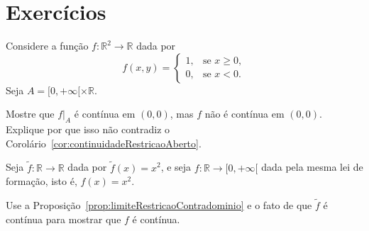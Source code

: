 \section*{Exercícios}

\begin{exercise}
    Considere a função $f:\mathbb R^2\to \mathbb R$ dada por
    \[
        f(x, y)=
        \begin{cases}
            1, & \text{se } x\geq 0,\\
            0, & \text{se } x<0.
        \end{cases}
    \]
    Seja $A=[0,+\infty[\times\mathbb R$.

    Mostre que $f|_A$ é contínua em $(0,0)$, mas $f$ não é contínua em $(0,0)$.
    Explique por que isso não contradiz o Corolário~\ref{cor:continuidadeRestricaoAberto}.
\end{exercise}

\begin{exercise}
    Seja $\widetilde f:\mathbb R\to\mathbb R$ dada por $\widetilde f(x)=x^2$,
    e seja $f:\mathbb R\to [0,+\infty[$ dada pela mesma lei de formação,
    isto é, $f(x)=x^2$.

    Use a Proposição~\ref{prop:limiteRestricaoContradominio} e o fato de que
    $\widetilde f$ é contínua para mostrar que $f$ é contínua.
\end{exercise}
